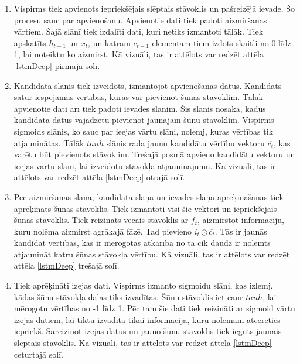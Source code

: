 \documentclass[12pt,paper=A4]{report}
\begin{document}
\begin{enumerate}
\item Vispirms tiek apvienots iepriekšējais slēptais stāvoklis un pašreizējā ievade. Šo procesu sauc par apvienošanu. Apvienotie dati tiek padoti aizmiršanas vārtiem. Šajā slānī tiek izdalīti dati, kuri netiks izmantoti tālāk. Tiek apskatīts $h_{t-1}$ un $x_t$, un katram $c_{t-1}$ elementam tiem izdots skaitli no 0 līdz 1, lai noteiktu ko aizmirst. Kā vizuāli, tas ir attēlots var redzēt attēla \ref{lstmDeep} pirmajā solī. 

\item Kandidāta slānis tiek izveidots, izmantojot apvienošanas datus. Kandidāts satur iespējamās vērtības, kuras var pievienot šūnas stāvoklim. Tālāk apvienotie dati arī tiek padoti ievades slānim. Šis slānis nosaka, kādus kandidāta datus vajadzētu pievienot jaunajam šūnu stāvoklim. Vispirms sigmoids slānis, ko sauc par ieejas vārtu slāni, nolemj, kuras vērtības tik atjauninātas. Tālāk $tanh$ slānis rada jaunu kandidātu vērtību vektoru $\overline{c_t}$, kas varētu būt pievienots stāvoklim. Trešajā posmā apvieno kandidātu vektoru un ieejas vārtu slāni, lai izveidotu stāvokļa atjauninājumu. Kā vizuāli, tas ir attēlots var redzēt attēla \ref{lstmDeep} otrajā solī.

\item Pēc aizmiršanas slāņa, kandidāta slāņa un ievades slāņa aprēķināšanas tiek aprēķināts šūnas stāvoklis. Tiek izmantoti visi šie vektori un iepriekšējais šūnas stāvoklis. Tiek reizināts vecais stāvoklis ar $f_t$, aizmirstot informāciju, kuru nolēma aizmirst agrākajā fāzē. Tad pievieno $ i_t \odot \overline{c_t}$. Tās ir jaunās kandidāt vērtības, kas ir mērogotas atkarībā no tā cik daudz ir nolemts atjaunināt katru šūnas stāvokļa vērtību. Kā vizuāli, tas ir attēlots var redzēt attēla \ref{lstmDeep} trešajā solī.

\item Tiek aprēķināti izejas dati. Vispirms izmanto sigmoidu slāni, kas izlemj, kādas šūnu stāvokļa daļas tiks izvadītas. Šūnu stāvoklis iet caur $tanh$, lai mērogotu vērtības no -1 līdz 1. Pēc tam šie dati tiek reizināti ar sigmoid vārtu izejas datiem, lai tiktu izvadīta tikai informācija, kuru nolēmām atcerēties iepriekš. Sareizinot izejas datus un jauno šūnu stāvoklis tiek iegūts jaunais slēptais stāvoklis. Kā vizuāli, tas ir attēlots var redzēt attēla \ref{lstmDeep} ceturtajā solī.

\end{enumerate}
\end{document}
